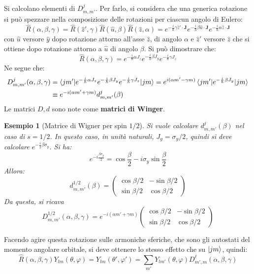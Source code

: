 \documentclass[11pt, a4paper]{scrartcl} %
\numberwithin{equation}{subsection}
\theoremstyle{style2}
\theoremstyle{style1}
\newtheorem{esempio}{Esempio}[section]
\begin{document}
Si calcolano elementi di $D^j_{m,m'} $.
Per farlo, si considera che una generica rotazione si pu\`o spezzare nella composizione delle rotazioni per ciascun angolo di Eulero:
\[
\hat{R}(\alpha ,\beta ,\gamma) = \hat{R}(\hat{z}', \gamma) \hat{R}(\hat{u},\beta ) \hat{R} (\hat{z},\alpha )=e^{-\frac{i}{\hbar }  \gamma \hat{z}' \cdot \mathbf{J} } e^{-\frac{i}{\hbar } \beta  \hat{u} \cdot \mathbf{J} } e^{-\frac{i}{\hbar } \alpha \hat{z} \cdot \mathbf{J} }
\] 
con $\hat{u}$ versore $\hat{y}$ dopo rotazione attorno all'asse $\hat{z}$, di angolo $\alpha $ e $\hat{z}'$ versore $\hat{z}$ che si ottiene dopo rotazione attorno a $\hat{u}$ di angolo $\beta $.
Si pu\`o dimostrare che:
\[
\hat{R}(\alpha ,\beta ,\gamma)  = e^{-\frac{i}{\hbar } \alpha  J_z}  e^{-\frac{i}{\hbar } \beta J_y} e^{-\frac{i}{\hbar } \gamma J_z}  
\] 
Ne segue che:
\begin{equation}
	\begin{split}
		D^j_{m,m'} (\alpha ,\beta ,\gamma) &= \braket{jm'|e^{-\frac{i}{\hbar } \alpha  J_z}  e^{-\frac{i}{\hbar } \beta J_y} e^{-\frac{i}{\hbar } \gamma J_z}  | jm} = e^{i(\alpha m' - \gamma m)}  \braket{jm'|e^{-\frac{i}{\hbar } \beta J_y} | jm} \\
						   &\equiv  e^{-i (\alpha m' + \gamma m)} d^j_{m,m'} (\beta )
	\end{split}
\end{equation}
Le matrici $D,d$ sono note come \textbf{matrici di Winger}. 
\begin{esempio}[Matrice di Wigner per spin $ 1/2$]
Si vuole calcolare $d^j _{m,m'} (\beta )$ nel caso di $s= 1 / 2$.
In questo caso, in unit\`a naturali, $J_y = \sigma _y / 2$, quindi si deve calcolare $e^{-\frac{i}{2}\beta \sigma _y} $.
Si ha:
\[
e^{-i \frac{\beta \sigma _y}{2}} = \cos \frac{\beta}{2} - i \sigma _y\sin \frac{\beta}{2}
\] 
Allora:
\begin{equation}
	d^{1 / 2} _{m,m'} (\beta ) = \begin{pmatrix} \cos \beta  / 2 & - \sin \beta / 2 \\ \sin \beta  / 2 & \cos \beta / 2 \end{pmatrix} 
\end{equation}
Da questa, si ricava
\begin{equation}
		D^{1 / 2} _{m,m'} (\alpha ,\beta ,\gamma) = e^{-i (\alpha m' + \gamma m)} \begin{pmatrix} \cos \beta  / 2 & - \sin \beta / 2 \\ \sin \beta  / 2 & \cos \beta / 2 \end{pmatrix}
\end{equation}
\end{esempio}
Facendo agire questa rotazione sulle armoniche sferiche, che sono gli autostati del momento angolare orbitale, si deve ottenere lo stesso effetto che su $\ket{jm} $, quindi:
\begin{equation}
	\hat{R}(\alpha , \beta , \gamma)  Y_{lm} (\theta , \varphi ) = Y_{lm} (\theta',\varphi ') = \sum_{m'}^{} Y_{lm'} (\theta ,\varphi ) D^\ell _{m',m} (\alpha ,\beta ,\gamma)
\end{equation}
\end{document}
